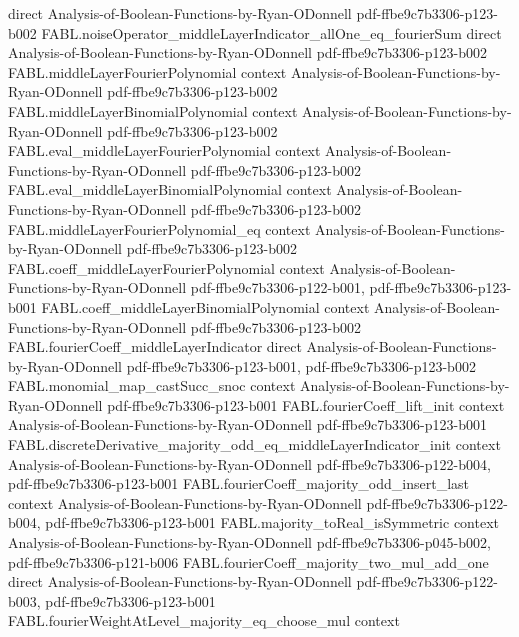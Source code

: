 \begin{theorem}
  {direct}
  {Analysis-of-Boolean-Functions-by-Ryan-ODonnell}
  {pdf-ffbe9c7b3306-p123-b002}
\proofstep
  {FABL.noiseOperator_middleLayerIndicator_allOne_eq_fourierSum}
  {direct}
  {Analysis-of-Boolean-Functions-by-Ryan-ODonnell}
  {pdf-ffbe9c7b3306-p123-b002}
\proofstep
  {FABL.middleLayerFourierPolynomial}
  {context}
  {Analysis-of-Boolean-Functions-by-Ryan-ODonnell}
  {pdf-ffbe9c7b3306-p123-b002}
\proofstep
  {FABL.middleLayerBinomialPolynomial}
  {context}
  {Analysis-of-Boolean-Functions-by-Ryan-ODonnell}
  {pdf-ffbe9c7b3306-p123-b002}
\proofstep
  {FABL.eval_middleLayerFourierPolynomial}
  {context}
  {Analysis-of-Boolean-Functions-by-Ryan-ODonnell}
  {pdf-ffbe9c7b3306-p123-b002}
\proofstep
  {FABL.eval_middleLayerBinomialPolynomial}
  {context}
  {Analysis-of-Boolean-Functions-by-Ryan-ODonnell}
  {pdf-ffbe9c7b3306-p123-b002}
\proofstep
  {FABL.middleLayerFourierPolynomial_eq}
  {context}
  {Analysis-of-Boolean-Functions-by-Ryan-ODonnell}
  {pdf-ffbe9c7b3306-p123-b002}
\proofstep
  {FABL.coeff_middleLayerFourierPolynomial}
  {context}
  {Analysis-of-Boolean-Functions-by-Ryan-ODonnell}
  {pdf-ffbe9c7b3306-p122-b001,
    pdf-ffbe9c7b3306-p123-b001}
\proofstep
  {FABL.coeff_middleLayerBinomialPolynomial}
  {context}
  {Analysis-of-Boolean-Functions-by-Ryan-ODonnell}
  {pdf-ffbe9c7b3306-p123-b002}
\proofstep
  {FABL.fourierCoeff_middleLayerIndicator}
  {direct}
  {Analysis-of-Boolean-Functions-by-Ryan-ODonnell}
  {pdf-ffbe9c7b3306-p123-b001,
    pdf-ffbe9c7b3306-p123-b002}
\proofstep
  {FABL.monomial_map_castSucc_snoc}
  {context}
  {Analysis-of-Boolean-Functions-by-Ryan-ODonnell}
  {pdf-ffbe9c7b3306-p123-b001}
\proofstep
  {FABL.fourierCoeff_lift_init}
  {context}
  {Analysis-of-Boolean-Functions-by-Ryan-ODonnell}
  {pdf-ffbe9c7b3306-p123-b001}
\proofstep
  {FABL.discreteDerivative_majority_odd_eq_middleLayerIndicator_init}
  {context}
  {Analysis-of-Boolean-Functions-by-Ryan-ODonnell}
  {pdf-ffbe9c7b3306-p122-b004,
    pdf-ffbe9c7b3306-p123-b001}
\proofstep
  {FABL.fourierCoeff_majority_odd_insert_last}
  {context}
  {Analysis-of-Boolean-Functions-by-Ryan-ODonnell}
  {pdf-ffbe9c7b3306-p122-b004,
    pdf-ffbe9c7b3306-p123-b001}
\proofstep
  {FABL.majority_toReal_isSymmetric}
  {context}
  {Analysis-of-Boolean-Functions-by-Ryan-ODonnell}
  {pdf-ffbe9c7b3306-p045-b002,
    pdf-ffbe9c7b3306-p121-b006}
\proofstep
  {FABL.fourierCoeff_majority_two_mul_add_one}
  {direct}
  {Analysis-of-Boolean-Functions-by-Ryan-ODonnell}
  {pdf-ffbe9c7b3306-p122-b003,
    pdf-ffbe9c7b3306-p123-b001}
\proofstep
  {FABL.fourierWeightAtLevel_majority_eq_choose_mul}
  {context}

\end{theorem}
